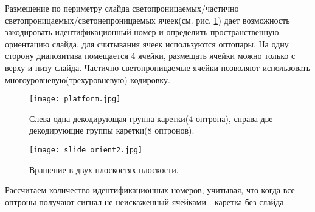 Размещение по периметру слайда светопроницаемых/частично светопроницаемых/светонепроницаемых ячеек(см. рис. \ref{fig:platform}) дает возможность закодировать идентификационный номер и определить пространственную ориентацию слайда, для считывания ячеек используются оптопары. На одну сторону диапозитива помещается 4 ячейки, размещать ячейки можно только с верху и низу слайда. Частично светопроницаемые ячейки  позволяют использовать многоуровневую(трехуровневую) кодировку.
\begin{figure}[ht]
	\centering
     \texttt{[image: platform.jpg]}
	\caption
	{
	Слева одна декодирующая группа каретки(4 оптрона), справа две декодирующие группы каретки(8 оптронов).
	}
	\label{fig:platform}
\end{figure}

\begin{figure}[ht]
	\centering
     \texttt{[image: slide\_orient2.jpg]}
	\caption
	{
	Вращение в двух плоскостях плоскости.
	}
	\label{fig:slide_orient2}
\end{figure}
Рассчитаем количество идентификационных номеров, учитывая, что когда все оптроны получают сигнал не неискаженный ячейками - каретка без слайда.
